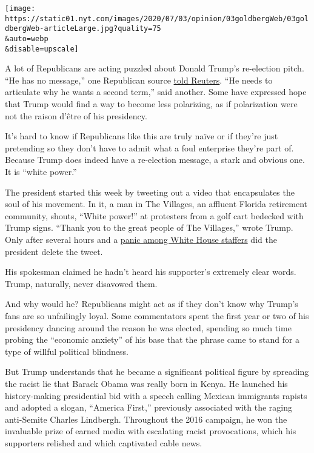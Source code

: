 \texttt{[image: https://static01.nyt.com/images/2020/07/03/opinion/03goldbergWeb/03goldbergWeb-articleLarge.jpg?quality=75\\\&auto=webp\\\&disable=upscale]}

A lot of Republicans are acting puzzled about Donald Trump's re-election
pitch. ``He has no message,'' one Republican source
\href{https://www.reuters.com/article/us-usa-election-trump/fearing-an-election-loss-trump-allies-push-him-to-be-less-polarizing-idUSKBN2427GT}{told
Reuters}. ``He needs to articulate why he wants a second term,'' said
another. Some have expressed hope that Trump would find a way to become
less polarizing, as if polarization were not the raison d'être of his
presidency.

It's hard to know if Republicans like this are truly naïve or if they're
just pretending so they don't have to admit what a foul enterprise
they're part of. Because Trump does indeed have a re-election message, a
stark and obvious one. It is ``white power.''

The president started this week by tweeting out a video that
encapsulates the soul of his movement. In it, a man in The Villages, an
affluent Florida retirement community, shouts, ``White power!'' at
protesters from a golf cart bedecked with Trump signs. ``Thank you to
the great people of The Villages,'' wrote Trump. Only after several
hours and a
\href{https://www.washingtonpost.com/politics/trump-white-power-tweet-set-off-a-scramble-inside-the-white-house--but-no-clear-condemnation/2020/06/29/6fd88c2c-ba21-11ea-8cf5-9c1b8d7f84c6_story.html}{panic
among White House staffers} did the president delete the tweet.

His spokesman claimed he hadn't heard his supporter's extremely clear
words. Trump, naturally, never disavowed them.

And why would he? Republicans might act as if they don't know why
Trump's fans are so unfailingly loyal. Some commentators spent the first
year or two of his presidency dancing around the reason he was elected,
spending so much time probing the ``economic anxiety'' of his base that
the phrase came to stand for a type of willful political blindness.

But Trump understands that he became a significant political figure by
spreading the racist lie that Barack Obama was really born in Kenya. He
launched his history-making presidential bid with a speech calling
Mexican immigrants rapists and adopted a slogan, ``America First,''
previously associated with the raging anti-Semite Charles Lindbergh.
Throughout the 2016 campaign, he won the invaluable prize of earned
media with escalating racist provocations, which his supporters relished
and which captivated cable news.

